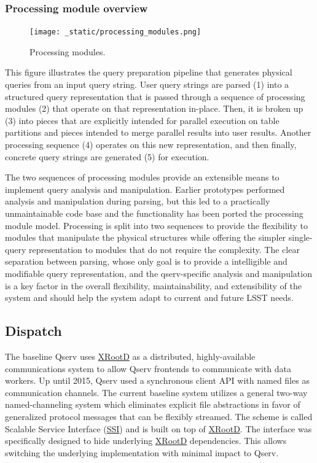 \documentclass[DM,lsstdraft,toc]{lsstdoc}
\begin{document}
\subsubsection{Processing module
overview}\label{processing-module-overview}

\begin{figure}[H]
\centering
\texttt{[image: \_static/processing\_modules.png]}
\caption{Processing modules.}
\end{figure}

This figure illustrates the query preparation pipeline that generates
physical queries from an input query string. User query strings are
parsed (1) into a structured query representation that is passed through
a sequence of processing modules (2) that operate on that representation
in-place. Then, it is broken up (3) into pieces that are explicitly
intended for parallel execution on table partitions and pieces intended
to merge parallel results into user results. Another processing sequence
(4) operates on this new representation, and then finally, concrete
query strings are generated (5) for execution.

The two sequences of processing modules provide an extensible means to
implement query analysis and manipulation. Earlier prototypes performed
analysis and manipulation during parsing, but this led to a practically
unmaintainable code base and the functionality has been ported the
processing module model. Processing is split into two sequences to
provide the flexibility to modules that manipulate the physical
structures while offering the simpler single-query representation to
modules that do not require the complexity. The clear separation between
parsing, whose only goal is to provide a intelligible and modifiable
query representation, and the qserv-specific analysis and manipulation
is a key factor in the overall flexibility, maintainability, and
extensibility of the system and should help the system adapt to current
and future LSST needs.

\subsection{Dispatch}\label{dispatch}

The baseline Qserv uses \href{http://xrootd.org}{XRootD} as a
distributed, highly-available communications system to allow Qserv
frontends to communicate with data workers. Up until 2015, Qserv used a
synchronous client API with named files as communication channels. The
current baseline system utilizes a general two-way named-channeling
system which eliminates explicit file abstractions in favor of
generalized protocol messages that can be flexibly streamed. The scheme
is called Scalable Service Interface (\href{}{SSI}) and is built on top
of \href{http://xrootd.org}{XRootD}. The interface was specifically
designed to hide underlying \href{http://xrootd.org}{XRootD}
dependencies. This allows switching the underlying implementation with
minimal impact to Qserv.
\end{document}
